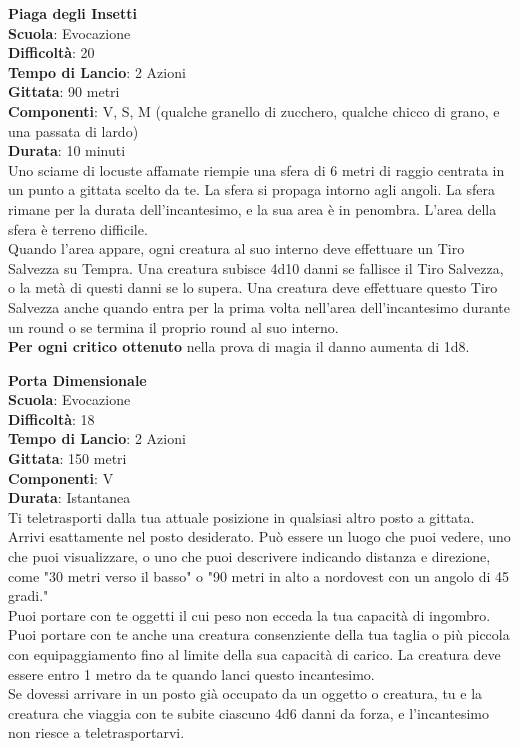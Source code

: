\begin{multicols}{2}
\medskip\textbf{Piaga degli Insetti}\\
\textbf{Scuola}: Evocazione\\
\textbf{Difficoltà}: 20\\
\textbf{Tempo di Lancio}: 2 Azioni\\
\textbf{Gittata}: 90 metri\\
\textbf{Componenti}: V, S, M (qualche granello di zucchero, qualche chicco di grano, e una passata di lardo)\\
\textbf{Durata}: 10 minuti\\
Uno sciame di locuste affamate riempie una sfera di 6 metri di raggio centrata in un punto a gittata scelto da te. La sfera si propaga intorno agli angoli. La sfera rimane per la durata dell'incantesimo, e la sua area è in penombra. L'area della sfera è terreno difficile.\\
Quando l'area appare, ogni creatura al suo interno deve effettuare un Tiro Salvezza su Tempra. Una creatura subisce 4d10 danni se fallisce il Tiro Salvezza, o la metà di questi danni se lo supera. Una creatura deve effettuare questo Tiro Salvezza anche quando entra per la prima volta nell'area dell'incantesimo durante un round o se termina il proprio round al suo interno.\\
\textbf{Per ogni critico ottenuto} nella prova di magia il danno aumenta di 1d8.

\medskip\textbf{Porta Dimensionale}\\
\textbf{Scuola}: Evocazione\\
\textbf{Difficoltà}: 18\\
\textbf{Tempo di Lancio}: 2 Azioni\\
\textbf{Gittata}: 150 metri\\
\textbf{Componenti}: V\\
\textbf{Durata}: Istantanea\\
Ti teletrasporti dalla tua attuale posizione in qualsiasi altro posto a gittata. Arrivi esattamente nel posto desiderato. Può essere un luogo che puoi vedere, uno che puoi visualizzare, o uno che puoi descrivere indicando distanza e direzione, come "30 metri verso il basso" o "90 metri in alto a nordovest con un angolo di 45 gradi."\\
Puoi portare con te oggetti il cui peso non ecceda la tua capacità di ingombro. Puoi portare con te anche una creatura consenziente della tua taglia o più piccola con equipaggiamento fino al limite della sua capacità di carico. La creatura deve essere entro 1 metro da te quando lanci questo incantesimo. \\
Se dovessi arrivare in un posto già occupato da un oggetto o creatura, tu e la creatura che viaggia con te subite ciascuno 4d6 danni da forza, e l'incantesimo non riesce a teletrasportarvi.


\end{multicols}
